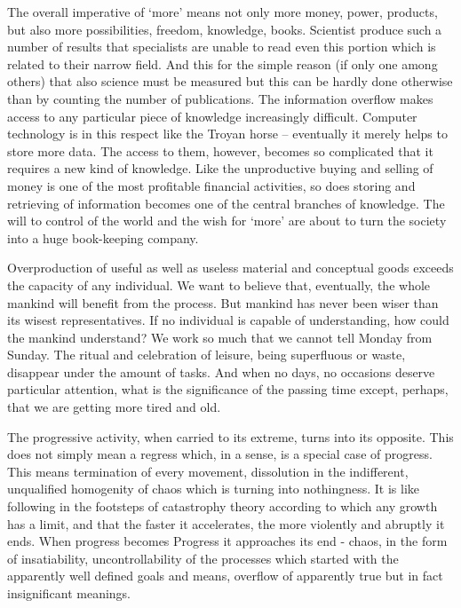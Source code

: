 The overall imperative of `more' means not only more money, power, products,
but also more possibilities, freedom, knowledge, books. 
Scientist produce such a number of results that specialists are unable to read
even this portion which is related to their narrow field. And this for the 
simple reason (if only one among others) that also science must be measured but
this can be hardly done otherwise than by counting the number of publications.
The information overflow makes access to any particular piece of knowledge
increasingly difficult. Computer technology is in this respect like the Troyan
horse -- eventually it merely helps to store more data. The access to them,
however, becomes so complicated that it requires a new kind of knowledge. Like
the unproductive buying and selling of money is one of the most profitable 
financial activities, so does storing and retrieving of information becomes
one of the central branches of knowledge. The will to control of the world and
the wish for `more' are about to turn the society into a huge book-keeping
company. 

Overproduction of useful as well as useless material and conceptual
goods exceeds the capacity of any individual. We want to believe that, 
eventually, the whole mankind will benefit from the process. But mankind has
never been wiser than its wisest representatives. If no individual is capable
of understanding, how could the mankind understand? We work so much that
we cannot tell Monday from Sunday. The ritual and celebration of leisure, being
superfluous or waste, disappear under the amount of tasks. And when no days,
no occasions deserve particular attention, what is the significance of the 
passing time except, perhaps, that we are getting more tired and old.

The progressive activity, when carried to its extreme, turns into its opposite.
This does not simply mean a regress which, in a sense, is a special case of 
progress. This means termination of every movement, dissolution in the 
indifferent, unqualified homogenity of chaos which is turning into nothingness.
It is like following in the footsteps of catastrophy theory according to which
any growth has a limit, and that the faster it accelerates, the more
violently and abruptly it ends.
When progress becomes Progress it approaches its end - chaos, in the form of
insatiability, uncontrollability of the processes which started with the 
apparently  well defined goals and means, overflow of apparently true but
in fact insignificant meanings.

